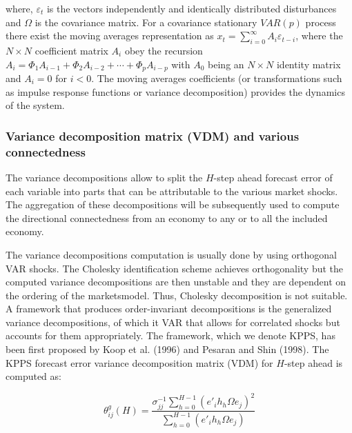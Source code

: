 \documentclass[]{elsarticle} %
\begin{document}
where, \({{\varepsilon }_{t}}\) is the vectors independently and
identically distributed disturbances and \(\Omega\) is the covariance
matrix. For a covariance stationary \(VAR\left( p \right)\) process
there exist the moving averages representation as
\({{x}_{t}}=\sum\nolimits_{i=0}^{\infty }{{{A}_{i}}{{\varepsilon }_{t-i}}}\),
where the \(N\times N\) coefficient matrix \({{A}_{i}}\) obey the
recursion
\({{A}_{i}}={{\Phi }_{1}}{{A}_{i-1}}+{{\Phi }_{2}}{{A}_{i-2}}+\cdots +{{\Phi }_{p}}{{A}_{i-p}}\)
with \({{A}_{0}}\) being an \(N\times N\) identity matrix and
\({{A}_{i}}=0\) for \(i<0\). The moving averages coefficients (or
transformations such as impulse response functions or variance
decomposition) provides the dynamics of the system.

\subsubsection{\texorpdfstring{\textbf{Variance decomposition matrix
(VDM) and various
connectedness}}{Variance decomposition matrix (VDM) and various connectedness}}\label{variance-decomposition-matrix-vdm-and-various-connectedness}

The variance decompositions allow to split the \(H\)-step ahead forecast
error of each variable into parts that can be attributable to the
various market shocks. The aggregation of these decompositions will be
subsequently used to compute the directional connectedness from an
economy to any or to all the included economy.

The variance decompositions computation is usually done by using
orthogonal VAR shocks. The Cholesky identification scheme achieves
orthogonality but the computed variance decompositions are then unstable
and they are dependent on the ordering of the marketsmodel. Thus,
Cholesky decomposition is not suitable. A framework that produces
order-invariant decompositions is the generalized variance
decompositions, of which it VAR that allows for correlated shocks but
accounts for them appropriately. The framework, which we denote KPPS,
has been first proposed by Koop et al. (1996) and Pesaran and Shin
(1998). The KPPS forecast error variance decomposition matrix (VDM) for
\(H\)-step ahead is computed as:

\[\theta _{ij}^{g}\left( H \right)=\frac{\sigma _{jj}^{-1}\sum\nolimits_{h=0}^{H-1}{{{\left( {{{{e}'}}_{i}}{{h}_{h}}\Omega {{e}_{j}} \right)}^{2}}}}{\sum\nolimits_{h=0}^{H-1}{\left( {{{{e}'}}_{i}}{{h}_{h}}\Omega {{e}_{j}} \right)}}\]
\end{document}
